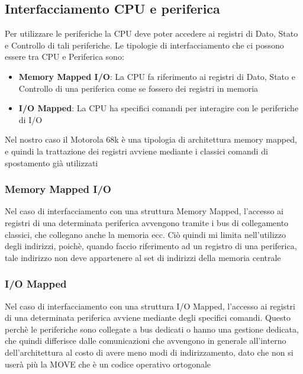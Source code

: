 \subsection{Interfacciamento CPU e periferica}
Per utilizzare le periferiche la CPU deve poter accedere ai registri di Dato, Stato e Controllo di tali periferiche. Le tipologie di interfacciamento che ci possono essere tra CPU e Periferica sono:
\begin{itemize}
    \item \textbf{Memory Mapped I/O}: La CPU fa riferimento ai registri di Dato, Stato e Controllo di una periferica come se fossero dei registri in memoria
    \item \textbf{I/O Mapped}: La CPU ha specifici comandi per interagire con le periferiche di I/O
\end{itemize}

Nel nostro caso il Motorola 68k è una tipologia di architettura memory mapped, e quindi la trattazione dei registri avviene mediante i classici comandi di spostamento già utilizzati

\subsubsection{Memory Mapped I/O}
Nel caso di interfacciamento con una struttura Memory Mapped, l'accesso ai registri di una determinata periferica avvengono tramite i bus di collegamento classici, che collegano anche la memoria ecc. Ciò quindi mi limita nell'utilizzo degli indirizzi, poichè, quando faccio riferimento ad un registro di una periferica, tale indirizzo non deve appartenere al set di indirizzi della memoria centrale

\subsubsection{I/O Mapped}
Nel caso di interfacciamento con una struttura I/O Mapped, l'accesso ai registri di una determinata periferica avviene mediante degli specifici comandi. Questo perchè le periferiche sono collegate a bus dedicati o hanno una gestione dedicata, che quindi differisce dalle comunicazioni che avvengono in generale all'interno dell'architettura al costo di avere meno modi di indirizzamento, dato che non si userà più la MOVE che è un codice operativo ortogonale

